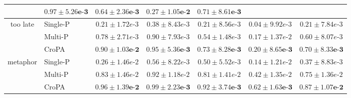 \begin{table}[ht]
{\begin{tabular}{clccccc}
 & $\mathbf{0.97\scriptscriptstyle \pm \scriptstyle5.26e\text{-}3}$
 & $\mathbf{0.64\scriptscriptstyle \pm \scriptstyle2.36e\text{-}3}$
 & $\mathbf{0.27\scriptscriptstyle \pm \scriptstyle1.05e\text{-}2}$
 & $\mathbf{0.71\scriptscriptstyle \pm \scriptstyle8.61e\text{-}3}$ \\
\hline
\multirow{3}{*}{\small{too late}}
 & \small{Single-P} 
 & $0.21\scriptscriptstyle \pm \scriptstyle1.72e\text{-}3$
 & $0.38\scriptscriptstyle \pm \scriptstyle8.43e\text{-}3$
 & $0.21\scriptscriptstyle \pm \scriptstyle8.56e\text{-}3$
 & $0.04\scriptscriptstyle \pm \scriptstyle9.92e\text{-}3$
 & $0.21\scriptscriptstyle \pm \scriptstyle7.84e\text{-}3$ \\
 & \small{Multi-P}
 & $0.78\scriptscriptstyle \pm \scriptstyle2.71e\text{-}3$
 & $0.90\scriptscriptstyle \pm \scriptstyle7.93e\text{-}3$
 & $0.54\scriptscriptstyle \pm \scriptstyle1.48e\text{-}3$
 & $0.17\scriptscriptstyle \pm \scriptstyle1.37e\text{-}2$
 & $0.60\scriptscriptstyle \pm \scriptstyle8.07e\text{-}3$ \\
 & \small{CroPA}
 & $\mathbf{0.90\scriptscriptstyle \pm \scriptstyle1.03e\text{-}2}$
 & $\mathbf{0.95\scriptscriptstyle \pm \scriptstyle5.36e\text{-}3}$
 & $\mathbf{0.73\scriptscriptstyle \pm \scriptstyle8.28e\text{-}3}$
 & $\mathbf{0.20\scriptscriptstyle \pm \scriptstyle8.65e\text{-}3}$
 & $\mathbf{0.70\scriptscriptstyle \pm \scriptstyle8.33e\text{-}3}$ \\
\hline
\multirow{3}{*}{\small{metaphor}}
 & \small{Single-P} 
 & $0.26\scriptscriptstyle \pm \scriptstyle1.46e\text{-}2$
 & $0.56\scriptscriptstyle \pm \scriptstyle8.22e\text{-}3$
 & $0.50\scriptscriptstyle \pm \scriptstyle5.52e\text{-}3$
 & $0.14\scriptscriptstyle \pm \scriptstyle1.21e\text{-}2$
 & $0.37\scriptscriptstyle \pm \scriptstyle8.83e\text{-}3$ \\
 & \small{Multi-P} 
 & $0.83\scriptscriptstyle \pm \scriptstyle1.46e\text{-}2$
 & $0.92\scriptscriptstyle \pm \scriptstyle1.18e\text{-}2$
 & $0.81\scriptscriptstyle \pm \scriptstyle1.41e\text{-}2$
 & $0.42\scriptscriptstyle \pm \scriptstyle1.35e\text{-}2$
 & $0.75\scriptscriptstyle \pm \scriptstyle1.36e\text{-}2$ \\
 & \small{CroPA} 
 & $\mathbf{0.96\scriptscriptstyle \pm \scriptstyle1.39e\text{-}2}$
 & $\mathbf{0.99\scriptscriptstyle \pm \scriptstyle2.23e\text{-}3}$
 & $\mathbf{0.92\scriptscriptstyle \pm \scriptstyle3.74e\text{-}3}$
 & $\mathbf{0.62\scriptscriptstyle \pm \scriptstyle1.63e\text{-}3}$
 & $\mathbf{0.87\scriptscriptstyle \pm \scriptstyle1.07e\text{-}2}$ \\
 \hline
\end{tabular}
}
\label{tab:different_target}
\end{table}

